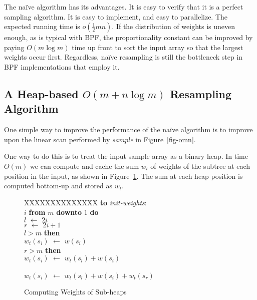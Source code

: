 \documentclass[12pt]{article}
\newcommand{\asgn}{\,\,\leftarrow\,\,}
\begin{document}
  The na\"ive algorithm has its advantages.  It is easy to
  verify that it is a perfect sampling algorithm.  It is
  easy to implement, and easy to parallelize.  The expected
  running time is $o(\frac{1}{2}mn)$.  If the distribution
  of weights is uneven enough, as is typical with BPF, the
  proportionality constant can be improved by paying $O(m
  \log m)$ time up front to sort the input array so that the
  largest weights occur first.  Regardless, na\"ive
  resampling is still the bottleneck step in BPF
  implementations that employ it.

\subsection{A Heap-based $O(m + n \log m)$ Resampling Algorithm}\label{sec-heap}

  One simple way to improve the performance of the na\"ive
  algorithm is to improve upon the linear scan performed by
  {\em sample} in Figure~\ref{fig-omn}.

  One way to do this is to treat the input sample array as a
  binary heap.  In time $O(m)$ we can compute and cache the
  sum $w_l$ of weights of the subtree at each position in
  the input, as shown in Figure~\ref{fig-heap}.  The sum at
  each heap position is computed bottom-up and stored as
  $w_t$.

  \begin{figure}
    \centering
    \begin{minipage}{0.6\textwidth}
      \begin{tabbing}
      XX\=XXXX\=XXXX\=XXXX\=\kill
      {\bf to} {\it init-weights}: \\
       $i$ {\bf from} $m$ {\bf downto} $1$ {\bf do} \\
      \>\>$l \asgn 2i$ \\
      \>\>$r \asgn 2i + 1$ \\
      \> $l > m$ {\bf then} \\
      \>\>\>$w_t(s_i) \asgn w(s_i)$ \\
      \> $r > m$ {\bf then} \\
      \>\>\>$w_t(s_i) \asgn w_t(s_l) + w(s_i)$ \\
      \>\\
      \>\>\>$w_t(s_i) \asgn w_t(s_l) + w(s_i) + w_t(s_r)$
    \end{tabbing}
    \end{minipage}
    \caption{Computing Weights of Sub-heaps}\label{fig-heap}
  \end{figure}
\end{document}
